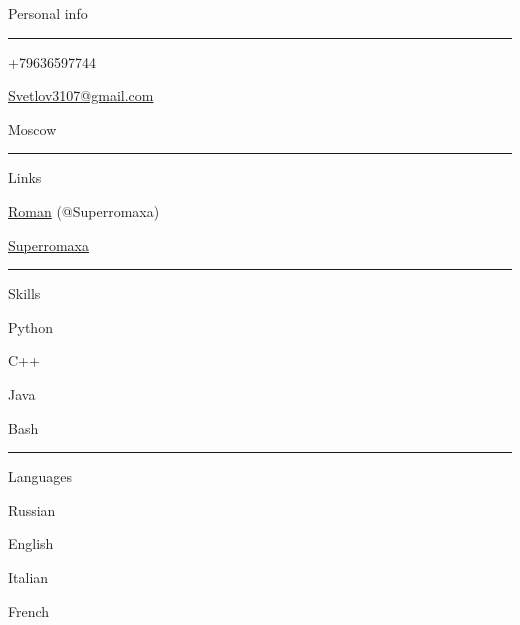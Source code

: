 \documentclass{letter}
\begin{document}
\begin{minipage}[t]{0.40\textwidth}
\setlength{\baselineskip}{1.5\baselineskip}
\color{white}
\vspace{1cm}
{\large Personal info}

\rule{\linewidth}{0.4pt}

\faPhone \quad +79636597744


\faEnvelope \quad \href{mailto:svetlov3107@gmail.com}{Svetlov3107@gmail.com}


\faMapMarker \quad Moscow

\rule{\linewidth}{0.4pt}

{\large Links}

\faTelegram \quad \href{https://t.me/Super_romaxa}{Roman} {(@Superromaxa)}

\faInstagram \quad \href{https://www.instagram.com/superromaxa?igsh=MTZraXFzZzZoODk5cg%3D%3D&utm_source=qr}{Superromaxa}

\rule{\linewidth}{0.4pt}

{\large Skills}

\faCircleNotch \quad Python

\faCircleNotch \quad C++

\faCircleNotch \quad Java

\faCircleNotch \quad Bash


\rule{\linewidth}{0.4pt}

{\large Languages}

\faLanguage \quad Russian

\faLanguage \quad English

\faLanguage \quad Italian

\faLanguage \quad French

\end{minipage}
\hfill
\end{document}
